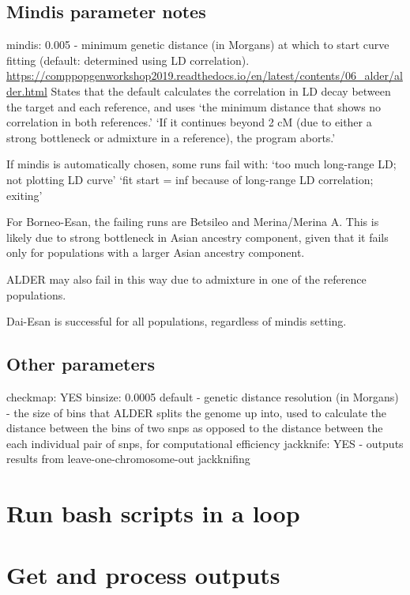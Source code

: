\documentclass[
]{article}
\begin{document}
\subsection{Mindis parameter notes}\label{mindis-parameter-notes}

mindis: 0.005 - minimum genetic distance (in Morgans) at which to start
curve fitting (default: determined using LD correlation).
\url{https://comppopgenworkshop2019.readthedocs.io/en/latest/contents/06_alder/alder.html}
States that the default calculates the correlation in LD decay between
the target and each reference, and uses `the minimum distance that shows
no correlation in both references.' `If it continues beyond 2 cM (due to
either a strong bottleneck or admixture in a reference), the program
aborts.'

If mindis is automatically chosen, some runs fail with: `too much
long-range LD; not plotting LD curve' `fit start = inf because of
long-range LD correlation; exiting'

For Borneo-Esan, the failing runs are Betsileo and Merina/Merina A. This
is likely due to strong bottleneck in Asian ancestry component, given
that it fails only for populations with a larger Asian ancestry
component.

ALDER may also fail in this way due to admixture in one of the reference
populations.

Dai-Esan is successful for all populations, regardless of mindis
setting.

\subsection{Other parameters}\label{other-parameters}

checkmap: YES binsize: 0.0005 default - genetic distance resolution (in
Morgans) - the size of bins that ALDER splits the genome up into, used
to calculate the distance between the bins of two snps as opposed to the
distance between the each individual pair of snps, for computational
efficiency jackknife: YES - outputs results from
leave-one-chromosome-out jackknifing

\section{Run bash scripts in a loop}\label{run-bash-scripts-in-a-loop}

\section{Get and process outputs}\label{get-and-process-outputs}
\end{document}
